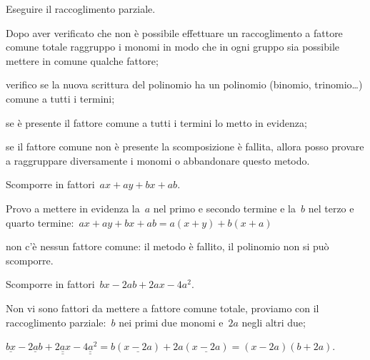 \begin{procedura}
Eseguire il raccoglimento parziale.
\begin{enumeratea}
\item Dopo aver verificato che non è possibile effettuare un raccoglimento a 
 fattore comune totale raggruppo i monomi in modo che in ogni gruppo sia 
 possibile mettere in comune qualche fattore;
\item verifico se la nuova scrittura del polinomio ha un polinomio 
 (binomio, trinomio\ldots) comune a tutti i termini;
\item se è presente il fattore comune a tutti i termini lo metto in evidenza;
\item se il fattore comune non è presente la scomposizione è fallita, allora 
 posso provare a raggruppare diversamente i monomi o abbandonare questo metodo.
\end{enumeratea}
\end{procedura}

 \begin{esempio}
Scomporre in fattori~\(ax+ay+bx+ab\).
  \begin{enumeratea}
  \item Provo a mettere in evidenza la~\(a\) nel primo e secondo termine e 
   la~\(b\) nel terzo e quarto termine:~\(ax+ay+bx+ab=a(x+y)+b(x+a)\)
  \item non c'è nessun fattore comune: il metodo è fallito, il polinomio non 
si può scomporre.
  \end{enumeratea}
 \end{esempio}

\newpage %

 \begin{esempio}
Scomporre in fattori~\(bx-2ab+2ax-4a^{2}\).
 \begin{enumeratea}
 \item Non vi sono fattori da mettere a fattore comune totale, proviamo con 
  il raccoglimento parziale:~\(b\) nei primi due monomi e~\(2a\) negli altri 
due;
 \item \(\underline{bx} -\underline{2ab}+\underline{\underline{2ax}}-
        \underline{\underline{4a^{2}}}=
        b(\underline{x-2a})+2a(\underline{x-2a})=(x-2a)(b+2a)\).
 \end{enumeratea}
 \end{esempio}


